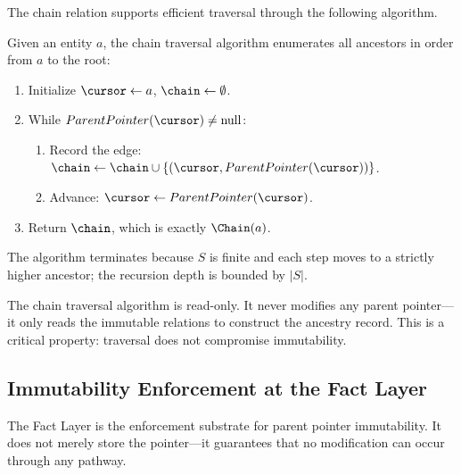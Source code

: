 The chain relation supports efficient traversal through the following algorithm.

\begin{algorithm}
Given an entity $a$, the chain traversal algorithm enumerates all ancestors in order from $a$ to the root:

\begin{enumerate}
    \item Initialize $\cursor \leftarrow a$, $\chain \leftarrow \emptyset$.
    \item While $ParentPointer(\cursor) \neq \text{null}$:
    \begin{enumerate}
        \item Record the edge: $\chain \leftarrow \chain \cup \{(\cursor, ParentPointer(\cursor))\}$.
        \item Advance: $\cursor \leftarrow ParentPointer(\cursor)$.
    \end{enumerate}
    \item Return $\chain$, which is exactly $\Chain(a)$.
\end{enumerate}

The algorithm terminates because $S$ is finite and each step moves to a strictly higher ancestor; the recursion depth is bounded by $|S|$.
\end{algorithm}

\begin{note}
The chain traversal algorithm is read-only. It never modifies any parent pointer—it only reads the immutable relations to construct the ancestry record. This is a critical property: traversal does not compromise immutability.
\end{note}

\subsection{Immutability Enforcement at the Fact Layer}

The Fact Layer is the enforcement substrate for parent pointer immutability. It does not merely store the pointer—it guarantees that no modification can occur through any pathway.

